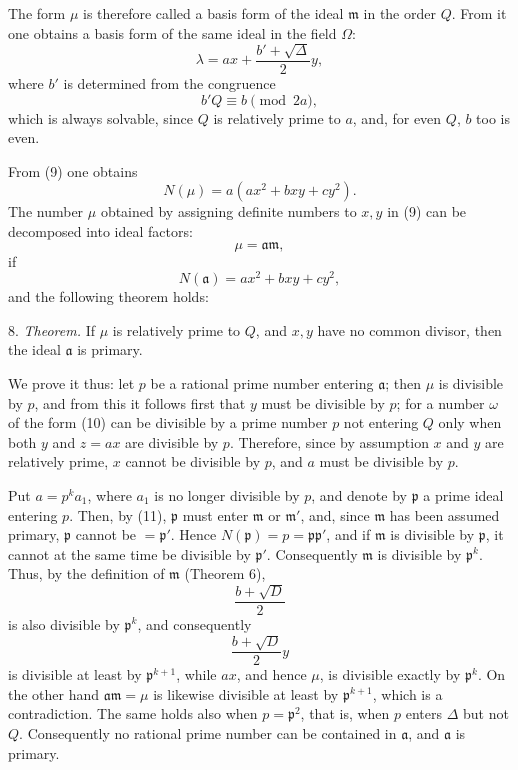 \documentclass[11pt]{article}
\begin{document}
The form $\mu$ is therefore called a basis form of the ideal $\mathfrak m$ in the order $Q$. From it one obtains a basis form of the same ideal in the field $\Omega$:
\[
 \lambda=ax+\frac{b'+\sqrt\Delta}{2}y,
\]
where $b'$ is determined from the congruence
\[
 b'Q\equiv b\pmod{2a},
\]
which is always solvable, since $Q$ is relatively prime to $a$, and, for even $Q$, $b$ too is even.

From (9) one obtains
\begin{equation}
 N(\mu)=a(ax^2+bxy+cy^2).
\tag{12}
\end{equation}
The number $\mu$ obtained by assigning definite numbers to $x,y$ in (9) can be decomposed into ideal factors:
\[
 \mu=\mathfrak a\mathfrak m,
\]
if
\begin{equation}
 N(\mathfrak a)=ax^2+bxy+cy^2,
\tag{13}
\end{equation}
and the following theorem holds:

8. \emph{Theorem.} If $\mu$ is relatively prime to $Q$, and $x,y$ have no common divisor, then the ideal $\mathfrak a$ is primary.

We prove it thus: let $p$ be a rational prime number entering $\mathfrak a$; then $\mu$ is divisible by $p$, and from this it follows first that $y$ must be divisible by $p$; for a number $\omega$ of the form (10) can be divisible by a prime number $p$ not entering $Q$ only when both $y$ and $z=ax$ are divisible by $p$. Therefore, since by assumption $x$ and $y$ are relatively prime, $x$ cannot be divisible by $p$, and $a$ must be divisible by $p$.

Put $a=p^ka_1$, where $a_1$ is no longer divisible by $p$, and denote by $\mathfrak p$ a prime ideal entering $p$. Then, by (11), $\mathfrak p$ must enter $\mathfrak m$ or $\mathfrak m'$, and, since $\mathfrak m$ has been assumed primary, $\mathfrak p$ cannot be $=\mathfrak p'$. Hence $N(\mathfrak p)=p=\mathfrak p\mathfrak p'$, and if $\mathfrak m$ is divisible by $\mathfrak p$, it cannot at the same time be divisible by $\mathfrak p'$. Consequently $\mathfrak m$ is divisible by $\mathfrak p^k$. Thus, by the definition of $\mathfrak m$ (Theorem 6),
\[
 \frac{b+\sqrt D}{2}
\]
is also divisible by $\mathfrak p^k$, and consequently
\[
 \frac{b+\sqrt D}{2}y
\]
is divisible at least by $\mathfrak p^{k+1}$, while $ax$, and hence $\mu$, is divisible exactly by $\mathfrak p^k$. On the other hand $\mathfrak a\mathfrak m=\mu$ is likewise divisible at least by $\mathfrak p^{k+1}$, which is a contradiction. The same holds also when $p=\mathfrak p^2$, that is, when $p$ enters $\Delta$ but not $Q$. Consequently no rational prime number can be contained in $\mathfrak a$, and $\mathfrak a$ is primary.
\end{document}
